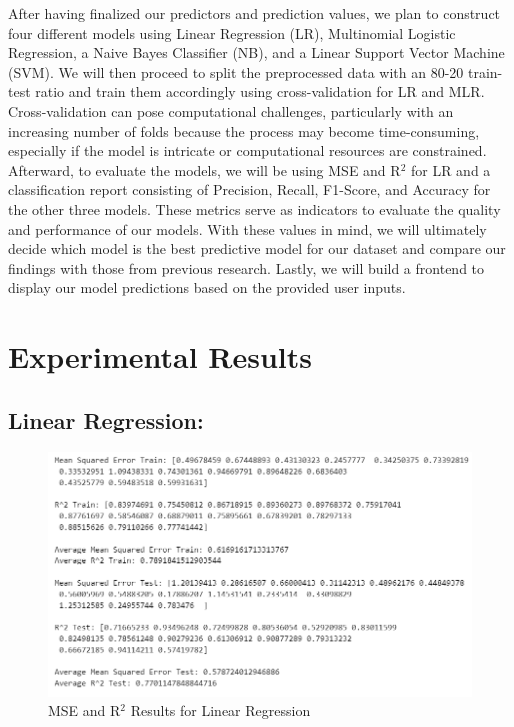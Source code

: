 \documentclass[11pt, letterpaper]{article}
\begin{document}
    \noindent After having finalized our predictors and prediction values, we plan to construct four different models using Linear Regression (LR), Multinomial Logistic Regression, a Naive Bayes Classifier (NB), and a Linear Support Vector Machine (SVM). We will then proceed to split the preprocessed data with an 80-20 train-test ratio and train them accordingly using cross-validation for LR and MLR. Cross-validation can pose computational challenges, particularly with an increasing number of folds because the process may become time-consuming, especially if the model is intricate or computational resources are constrained.\\

    \noindent Afterward, to evaluate the models, we will be using MSE and R$^2$ for LR and a classification report consisting of Precision, Recall, F1-Score, and Accuracy for the other three models. These metrics serve as indicators to evaluate the quality and performance of our models. With these values in mind, we will ultimately decide which model is the best predictive model for our dataset and compare our findings with those from previous research. Lastly, we will build a frontend to display our model predictions based on the provided user inputs.
    
    \section*{Experimental Results}

    \noindent\subsection*{Linear Regression:}

    \begin{figure}[H]
        \centering
        \includegraphics[width=\columnwidth]{lr-report.png}
        \caption{MSE and R$^2$ Results for Linear Regression}
        \label{fig:class-report-lr}
    \end{figure}
\end{document}
